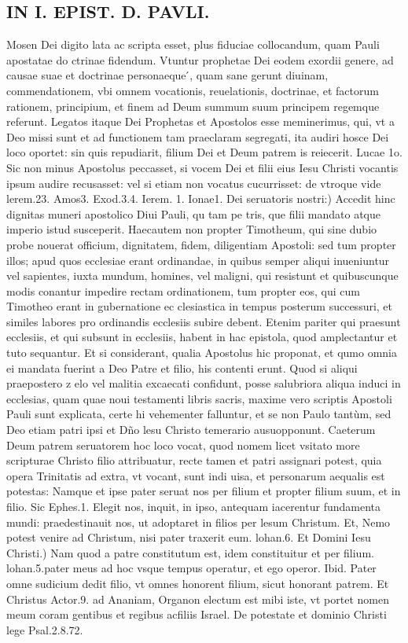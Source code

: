 \documentclass{article}
\begin{document}
\begin{pages}
\section*{IN I. EPIST. D. PAVLI. }
\marginpar{[ p.4 ]}\pstart Mosen Dei digito lata ac scripta esset, plus fiduciae collocandum, quam Pauli apostatae do ctrinae fidendum. Vtuntur prophetae Dei eodem exordii genere, ad causae suae et doctrinae personaeque ́, quam sane gerunt diuinam, commendationem, vbi omnem vocationis, reuelationis, doctrinae, et factorum rationem, principium, et finem ad Deum summum suum principem regemque  referunt. Legatos itaque  Dei Prophetas et Apostolos esse meminerimus, qui, vt a Deo missi sunt et ad functionem tam praeclaram segregati, ita audiri hosce Dei loco oportet: sin quis repudiarit, filium Dei et Deum patrem is reiecerit. Lucae 1o. Sic non minus Apostolus peccasset, si vocem Dei et filii eius Iesu Christi vocantis ipsum audire recusasset: vel si etiam non vocatus cucurrisset: de vtroque  vide lerem.23. Amos3. Exod.3.4. Ierem. 1. Ionae1.  \pend\pstart Dei seruatoris nostri:) Accedit hinc dignitas muneri apostolico Diui Pauli, qu tam pe tris, que  filii mandato atque  imperio istud susceperit. Haecautem non propter Timotheum, qui sine dubio probe nouerat officium, dignitatem, fidem, diligentiam Apostoli: sed tum propter illos; apud quos ecclesiae erant ordinandae, in quibus semper aliqui inueniuntur vel sapientes, iuxta mundum, homines, vel maligni, qui resistunt et quibuscunque  modis conantur impedire rectam ordinationem, tum propter eos, qui cum Timotheo erant in gubernatione ec clesiastica in tempus posterum successuri, et similes labores pro ordinandis ecclesiis subire debent. Etenim pariter qui praesunt ecclesiis, et qui subsunt in ecclesiis, habent in hac epistola, quod amplectantur et tuto sequantur. Et si considerant, qualia Apostolus hic proponat, et qumo omnia ei mandata fuerint a Deo Patre et filio, his contenti erunt. Quod si aliqui praepostero z elo vel malitia excaecati confidunt, posse salubriora aliqua induci in ecclesias, quam quae noui testamenti libris sacris, maxime vero scriptis Apostoli Pauli sunt explicata, certe hi vehementer falluntur, et se non Paulo tantùm, sed Deo etiam patri ipsi et Dño lesu Christo temerario ausuopponunt. Caeterum Deum patrem seruatorem hoc loco vocat, quod nomem licet vsitato more scripturae Christo filio attribuatur, recte tamen et patri assignari potest, quia opera Trinitatis ad extra, vt vocant, sunt indi uisa, et personarum aequalis est potestas: Namque  et ipse pater seruat nos per filium et propter filium suum, et in filio. Sic Ephes.1. Elegit nos, inquit, in ipso, antequam iacerentur fundamenta mundi: praedestinauit nos, ut adoptaret in filios per lesum Christum. Et, Nemo potest venire ad Christum, nisi pater traxerit eum. lohan.6.  \pend\pstart Et Domini Iesu Christi.) Nam quod a patre constitutum est, idem constituitur et per filium. lohan.5.pater meus ad hoc vsque  tempus operatur, et ego operor. Ibid. Pater omne sudicium dedit filio, vt omnes honorent filium, sicut honorant patrem. Et Christus Actor.9. ad Ananiam, Organon electum est mibi iste, vt portet nomen meum coram gentibus et regibus acfiliis Israel. De potestate et dominio Christi lege Psal.2.8.72. 
\end{pages}
\end{document}
